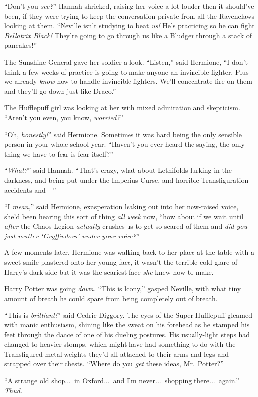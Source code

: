 “Don’t you \emph{see?}” Hannah shrieked, raising her voice a lot louder then it should’ve been, if they were trying to keep the conversation private from all the Ravenclaws looking at them. “Neville isn’t studying to beat \emph{us!} He’s practicing so he can fight \emph{Bellatrix Black!} They’re going to go through us like a Bludger through a stack of pancakes!”

The Sunshine General gave her soldier a look. “Listen,” said Hermione, “I don’t think a few weeks of practice is going to make anyone an invincible fighter. Plus we already \emph{know} how to handle invincible fighters. We’ll concentrate fire on them and they’ll go down just like Draco.”

The Hufflepuff girl was looking at her with mixed admiration and skepticism. “Aren’t you even, you know, \emph{worried?}”

“Oh, \emph{honestly!}” said Hermione. Sometimes it was hard being the only sensible person in your whole school year. “Haven’t you ever heard the saying, the only thing we have to fear is fear itself?”

“\emph{What?}” said Hannah. “That’s crazy, what about Lethifolds lurking in the darkness, and being put under the Imperius Curse, and horrible Transfiguration accidents and—”

“I \emph{mean,}” said Hermione, exasperation leaking out into her now-raised voice, she’d been hearing this sort of thing \emph{all week} now, “how about if we wait until \emph{after} the Chaos Legion \emph{actually} crushes us to get so scared of them and \emph{did you just mutter ‘Gryffindors’ under your voice?}”

A few moments later, Hermione was walking back to her place at the table with a sweet smile plastered onto her young face, it wasn’t the terrible cold glare of Harry’s dark side but it was the scariest face \emph{she} knew how to make.

Harry Potter was going \emph{down.}
\sbreak
“This is loony,” gasped Neville, with what tiny amount of breath he could spare from being completely out of breath.

“This is \emph{brilliant!}” said Cedric Diggory. The eyes of the Super Hufflepuff gleamed with manic enthusiasm, shining like the sweat on his forehead as he stamped his feet through the dance of one of his dueling postures. His usually-light steps had changed to heavier stomps, which might have had something to do with the Transfigured metal weights they’d all attached to their arms and legs and strapped over their chests. “Where do you \emph{get} these ideas, Mr.~Potter?”

“A strange old shop...\ in Oxford...\ and I’m never...\ shopping there...\ again.” \emph{Thud.}


